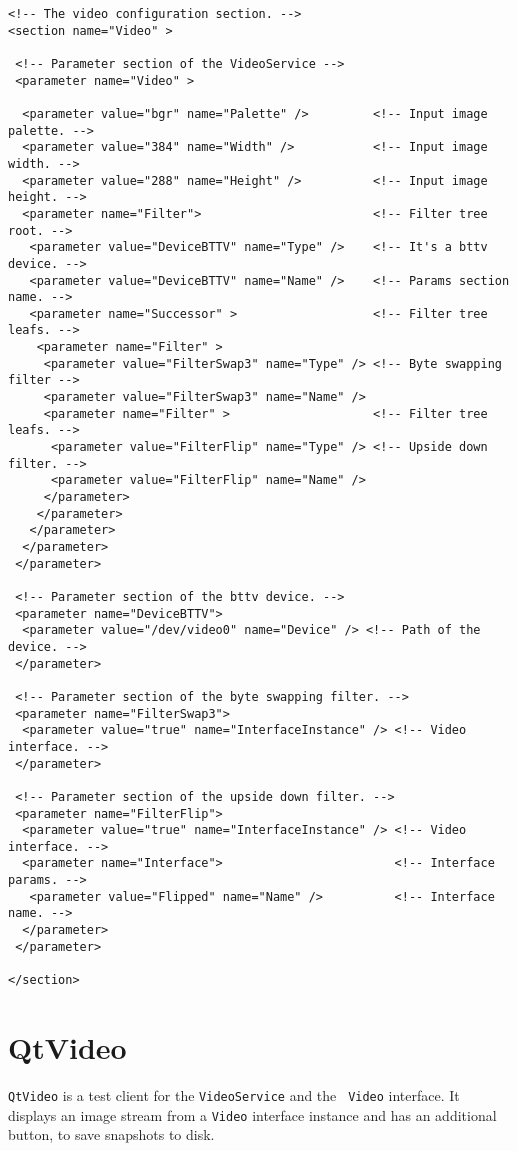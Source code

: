 \begin{verbatim}
<!-- The video configuration section. -->
<section name="Video" >

 <!-- Parameter section of the VideoService -->
 <parameter name="Video" >

  <parameter value="bgr" name="Palette" />         <!-- Input image palette. -->
  <parameter value="384" name="Width" />           <!-- Input image width. -->
  <parameter value="288" name="Height" />          <!-- Input image height. -->
  <parameter name="Filter">                        <!-- Filter tree root. -->
   <parameter value="DeviceBTTV" name="Type" />    <!-- It's a bttv device. -->
   <parameter value="DeviceBTTV" name="Name" />    <!-- Params section name. -->   
   <parameter name="Successor" >                   <!-- Filter tree leafs. -->
    <parameter name="Filter" >
     <parameter value="FilterSwap3" name="Type" /> <!-- Byte swapping filter -->
     <parameter value="FilterSwap3" name="Name" />
     <parameter name="Filter" >                    <!-- Filter tree leafs. -->
      <parameter value="FilterFlip" name="Type" /> <!-- Upside down filter. -->
      <parameter value="FilterFlip" name="Name" />
     </parameter> 
    </parameter>
   </parameter>
  </parameter>
 </parameter>

 <!-- Parameter section of the bttv device. -->
 <parameter name="DeviceBTTV">                   
  <parameter value="/dev/video0" name="Device" /> <!-- Path of the device. -->
 </parameter>

 <!-- Parameter section of the byte swapping filter. -->
 <parameter name="FilterSwap3">
  <parameter value="true" name="InterfaceInstance" /> <!-- Video interface. -->
 </parameter>

 <!-- Parameter section of the upside down filter. -->
 <parameter name="FilterFlip">
  <parameter value="true" name="InterfaceInstance" /> <!-- Video interface. -->
  <parameter name="Interface">                        <!-- Interface params. -->
   <parameter value="Flipped" name="Name" />          <!-- Interface name. -->
  </parameter>
 </parameter> 

</section>
\end{verbatim}

\section{QtVideo}

{\tt QtVideo} is a test client for the {\tt VideoService} and the {\tt
  Video} interface. It displays an image stream from a {\tt Video}
interface instance and has an additional button, to save snapshots to
disk.

